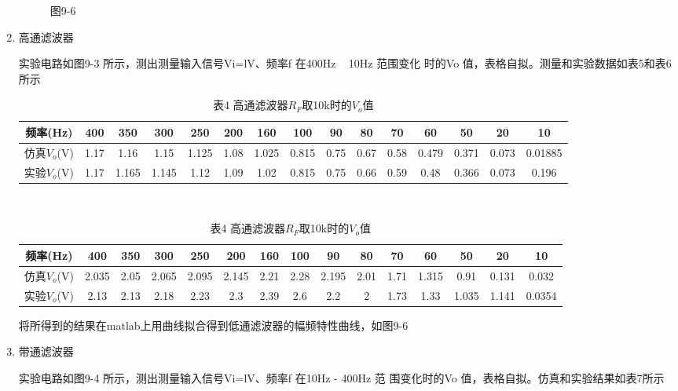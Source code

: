 \documentclass[a4paper,10pt,notitlepage]{article}
\begin{document}
\begin{enumerate}
\begin{figure}[h]
		\caption*{图9-6}
	\end{figure}
	\newpage
	\item 高通滤波器\par 
	实验电路如图9-3 所示，测出测量输入信号Vi=lV、频率f 在400Hz ~ 10Hz 范围变化
	时的Vo 值，表格自拟。测量和实验数据如表5和表6所示
	\begin{table}[h]
		\begin{minipage}{0.3\textwidth}
			\centering
			\begin{tabular}{|c|c|c|c|c|c|c|c|c|c|c|c|c|c|c|}
				\hline
				频率(Hz) & 400 & 350 & 300 & 250 & 200 & 160 & 100 & 90 & 80 & 70 & 60 & 50 & 20 & 10 \\
				\hline
				仿真$V_o$(V) & 1.17 & 1.16 & 1.15 & 1.125 & 1.08 & 1.025 & 0.815 & 0.75 & 0.67 & 0.58 & 0.479 & 0.371 & 0.073 & 0.01885\\
				\hline 
				实验$V_o$(V) & 1.17 & 1.165 & 1.145 & 1.12 & 1.09 & 1.02 & 0.815 & 0.75 & 0.66 & 0.59 & 0.48 & 0.366 & 0.073 & 0.196 \\
				\hline
			\end{tabular}
			\caption*{表3 高通滤波器$R_F$取2k时的$V_o$值}
		\end{minipage}
		\\
		\begin{minipage}{0.3\textwidth}
			\centering
			\begin{tabular}{|c|c|c|c|c|c|c|c|c|c|c|c|c|c|c|}
				\hline
				频率(Hz) & 400 & 350 & 300 & 250 & 200 & 160 & 100 & 90 & 80 & 70 & 60 & 50 & 20 & 10 \\
				\hline
				仿真$V_o$(V) & 2.035 & 2.05 & 2.065 & 2.095 & 2.145 & 2.21 & 2.28 & 2.195 & 2.01 & 1.71 & 1.315 & 0.91 & 0.131 & 0.032 \\
				\hline 
				实验$V_o$(V) & 2.13 & 2.13 & 2.18 & 2.23 & 2.3 & 2.39 & 2.6 & 2.2 & 2 & 1.73 & 1.33 & 1.035 & 1.141 & 0.0354 \\
				\hline
			\end{tabular}
			\caption*{表4 高通滤波器$R_F$取10k时的$V_o$值}
		\end{minipage}
	\end{table}
	将所得到的结果在matlab上用曲线拟合得到低通滤波器的幅频特性曲线，如图9-6
	\newpage
	\item 带通滤波器\par 
	实验电路如图9-4 所示，测出测量输入信号Vi=lV、频率f 在10Hz - 400Hz 范
	围变化时的Vo 值，表格自拟。仿真和实验结果如表7所示
	\begin{table}[h]
		\centering
		\begin{tabular}{|c|c|c|c|c|c|c|c|c|c|c|c|c|c|}

\end{tabular}
\end{table}
\end{enumerate}
\end{document}
